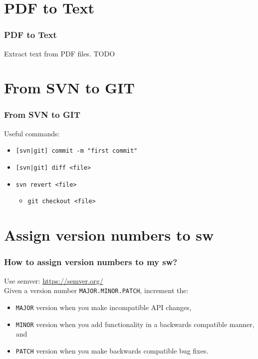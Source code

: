 \documentclass[pdf]{beamer}
\newcommand{\mono}[1]{\texttt{#1}}
\begin{document}
\section{PDF to Text}
\begin{frame}
  \frametitle{PDF to Text}
  Extract text from PDF files.
  TODO
\end{frame}


\section{From SVN to GIT}
\begin{frame}
  \frametitle{From SVN to GIT}
  Useful commands:
  \begin{itemize}
    \item \mono{[svn|git] commit -m "first commit"}
    \item \mono{[svn|git] diff <file>}
    
    \item \mono{svn revert <file>}
      \begin{itemize}
      \item \mono{git checkout <file>}
      \end{itemize}
  \end{itemize}
\end{frame}


\section{Assign version numbers to sw}
\begin{frame}
  \frametitle{How to assign version numbers to my sw?}
  Use semver: \url{https://semver.org/}\\
  Given a version number \mono{MAJOR.MINOR.PATCH}, increment the:
  \begin{itemize}
    \item \mono{MAJOR} version when you make incompatible API changes,
    \item \mono{MINOR} version when you add functionality in a backwards compatible manner, and
    \item \mono{PATCH} version when you make backwards compatible bug fixes.
  \end{itemize}
\end{frame}
\end{document}
